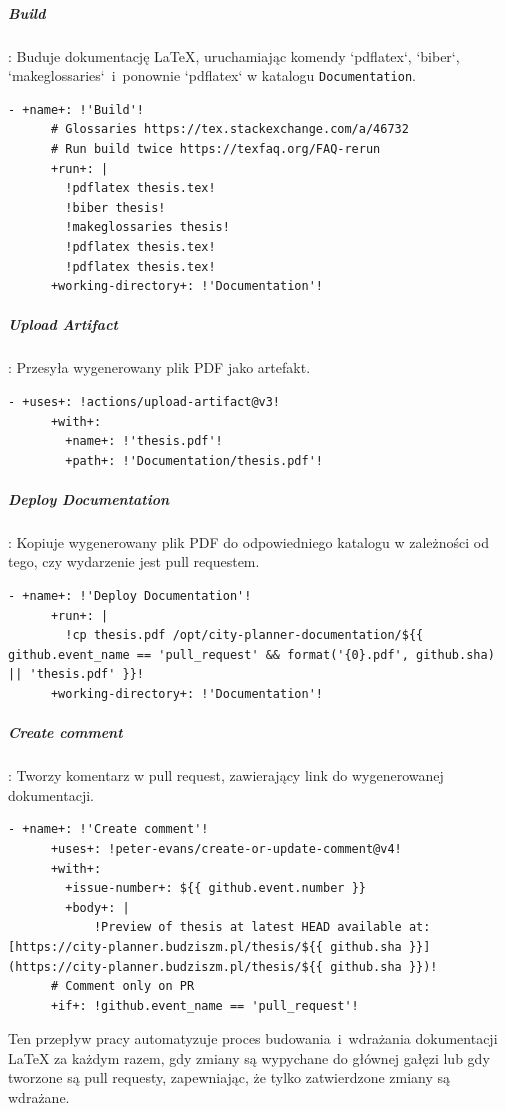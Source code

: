 \subparagraph{Build}: Buduje dokumentację LaTeX, uruchamiając komendy `pdflatex`, `biber`, `makeglossaries`~i~ponownie `pdflatex` w katalogu \texttt{\textcolor{codeblue}{Documentation}}.
\begin{lstlisting}[style=yaml-colored]
    - +name+: !'Build'!
      # Glossaries https://tex.stackexchange.com/a/46732
      # Run build twice https://texfaq.org/FAQ-rerun
      +run+: |
        !pdflatex thesis.tex!
        !biber thesis!
        !makeglossaries thesis!
        !pdflatex thesis.tex!
        !pdflatex thesis.tex!
      +working-directory+: !'Documentation'!
\end{lstlisting}

\subparagraph{Upload Artifact}: Przesyła wygenerowany plik PDF jako artefakt.
\begin{lstlisting}[style=yaml-colored]
    - +uses+: !actions/upload-artifact@v3!
      +with+:
        +name+: !'thesis.pdf'!
        +path+: !'Documentation/thesis.pdf'!
\end{lstlisting}

\subparagraph{Deploy Documentation}: Kopiuje wygenerowany plik PDF do odpowiedniego katalogu w zależności od tego, czy wydarzenie jest pull requestem.
\begin{lstlisting}[style=yaml-colored]
    - +name+: !'Deploy Documentation'!
      +run+: |
        !cp thesis.pdf /opt/city-planner-documentation/${{ github.event_name == 'pull_request' && format('{0}.pdf', github.sha) || 'thesis.pdf' }}!
      +working-directory+: !'Documentation'!
\end{lstlisting}

\subparagraph{Create comment}: Tworzy komentarz w pull request, zawierający link do wygenerowanej dokumentacji.
\begin{lstlisting}[style=yaml-colored]
    - +name+: !'Create comment'!
      +uses+: !peter-evans/create-or-update-comment@v4!
      +with+:
        +issue-number+: ${{ github.event.number }}
        +body+: |
            !Preview of thesis at latest HEAD available at: [https://city-planner.budziszm.pl/thesis/${{ github.sha }}](https://city-planner.budziszm.pl/thesis/${{ github.sha }})!
      # Comment only on PR
      +if+: !github.event_name == 'pull_request'!
\end{lstlisting}

Ten przepływ pracy automatyzuje proces budowania~i~wdrażania dokumentacji LaTeX za każdym razem, gdy zmiany są wypychane do głównej gałęzi lub gdy tworzone są pull requesty, zapewniając, że tylko zatwierdzone zmiany są wdrażane.

